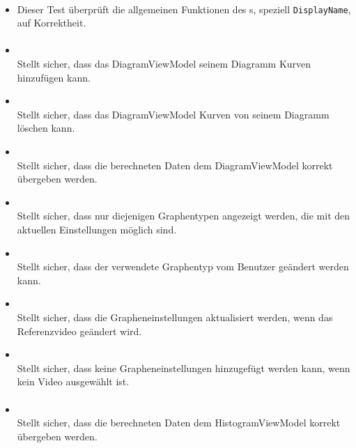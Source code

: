 \paragraph{}

\begin{itemize}

\item{}
Dieser Test überprüft die allgemeinen Funktionen des s, speziell \verb#DisplayName#, auf Korrektheit.

\end{itemize}

\paragraph{}
\begin{itemize}
	\item{} \\
		Stellt sicher, dass das DiagramViewModel seinem Diagramm Kurven hinzufügen kann.

	\item{} \\
		Stellt sicher, dass das DiagramViewModel Kurven von seinem Diagramm löschen kann.

	\item{} \\
		Stellt sicher, dass die berechneten Daten dem DiagramViewModel korrekt übergeben werden.
	
	\item{} \\
		Stellt sicher, dass nur diejenigen Graphentypen angezeigt werden, die mit den aktuellen Einstellungen möglich sind.
	
	\item{} \\
		Stellt sicher, dass der verwendete Graphentyp vom Benutzer geändert werden kann.
	
	\item{} \\
		Stellt sicher, dass die Grapheneinstellungen aktualisiert werden, wenn das Referenzvideo geändert wird.
	
	\item{} \\
		Stellt sicher, dass keine Grapheneinstellungen hinzugefügt werden kann, wenn kein Video ausgewählt ist.
\end{itemize}


\paragraph{}
\begin{itemize}
	\item{} \\
		Stellt sicher, dass die berechneten Daten dem HistogramViewModel korrekt übergeben werden.
\end{itemize}
